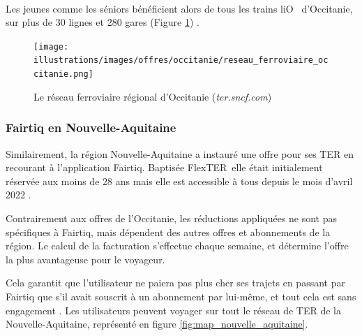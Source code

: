 \documentclass[a4paper]{article}
\begin{document}
\paragraph{}
Les jeunes comme les séniors bénéficient alors de tous les trains \og liO \fg\ d'Occitanie, sur plus de 30 lignes
et 280 gares (Figure \ref*{fig:map_occitanie}) \cite{stats-ter-occitanie}.


\begin{figure}
  \centering
  \texttt{[image: illustrations/images/offres/occitanie/reseau\_ferroviaire\_occitanie.png]}
  \caption{Le réseau ferroviaire régional d'Occitanie (\textit{ter.sncf.com})}
  \label{fig:map_occitanie}
\end{figure}


\clearpage

\subsubsection{Fairtiq en Nouvelle-Aquitaine}
Similairement, la région Nouvelle-Aquitaine a instauré une offre pour ses TER
en recourant à l'application Fairtiq. Baptisée \og FlexTER\fg\, elle était initialement réservée aux moins de 28 ans
mais elle est accessible à tous depuis le mois d'avril 2022 \cite{extention-toute-nouvelle-aquitaine}.

Contrairement aux offres de l'Occitanie, les réductions appliquées ne sont pas spécifiques à Fairtiq,
mais dépendent des autres offres et abonnements de la région. Le calcul de la facturation s'effectue chaque semaine,
et détermine l'offre la plus avantageuse pour le voyageur.

Cela garantit que l'utilisateur ne paiera pas plus cher ses trajets en passant par
Fairtiq que s'il avait souscrit à un abonnement par lui-même, et tout cela est sans engagement \cite{flexter}.
Les utilisateurs peuvent voyager sur tout le réseau de TER de la Nouvelle-Aquitaine, représenté
en figure \ref*{fig:map_nouvelle_aquitaine}.
\end{document}
